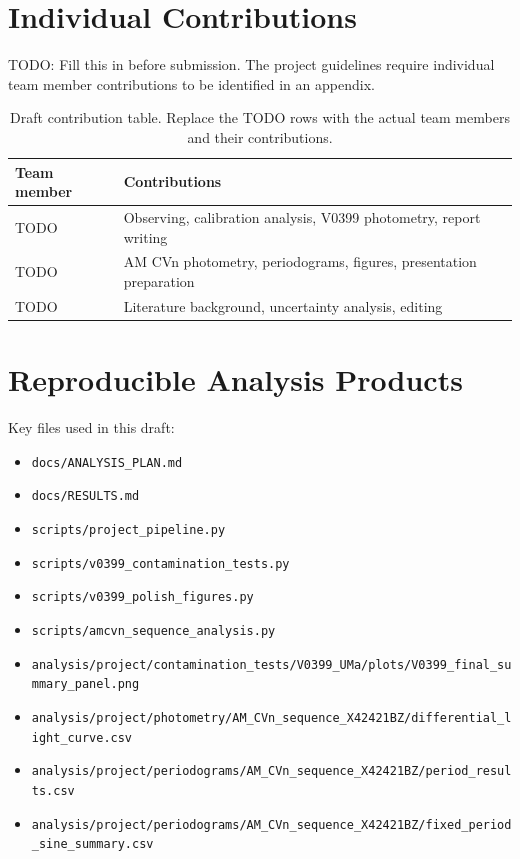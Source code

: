 \documentclass[11pt]{article}
\begin{document}
\appendix

\section{Individual Contributions}

TODO: Fill this in before submission. The project guidelines require individual
team member contributions to be identified in an appendix.

\begin{table}[H]
  \centering
  \caption{Draft contribution table. Replace the TODO rows with the actual team
  members and their contributions.}
  \begin{tabular}{p{}p{}}
    \toprule
    Team member & Contributions \\
    \midrule
    TODO & Observing, calibration analysis, V0399 photometry, report writing \\
    TODO & AM CVn photometry, periodograms, figures, presentation preparation \\
    TODO & Literature background, uncertainty analysis, editing \\
    \bottomrule
  \end{tabular}
\end{table}

\section{Reproducible Analysis Products}

Key files used in this draft:
\begin{itemize}
  \item \texttt{docs/ANALYSIS\_PLAN.md}
  \item \texttt{docs/RESULTS.md}
  \item \texttt{scripts/project\_pipeline.py}
  \item \texttt{scripts/v0399\_contamination\_tests.py}
  \item \texttt{scripts/v0399\_polish\_figures.py}
  \item \texttt{scripts/amcvn\_sequence\_analysis.py}
  \item \texttt{analysis/project/contamination\_tests/V0399\_UMa/plots/V0399\_final\_summary\_panel.png}
  \item \texttt{analysis/project/photometry/AM\_CVn\_sequence\_X42421BZ/differential\_light\_curve.csv}
  \item \texttt{analysis/project/periodograms/AM\_CVn\_sequence\_X42421BZ/period\_results.csv}
  \item \texttt{analysis/project/periodograms/AM\_CVn\_sequence\_X42421BZ/fixed\_period\_sine\_summary.csv}
\end{itemize}
\end{document}
